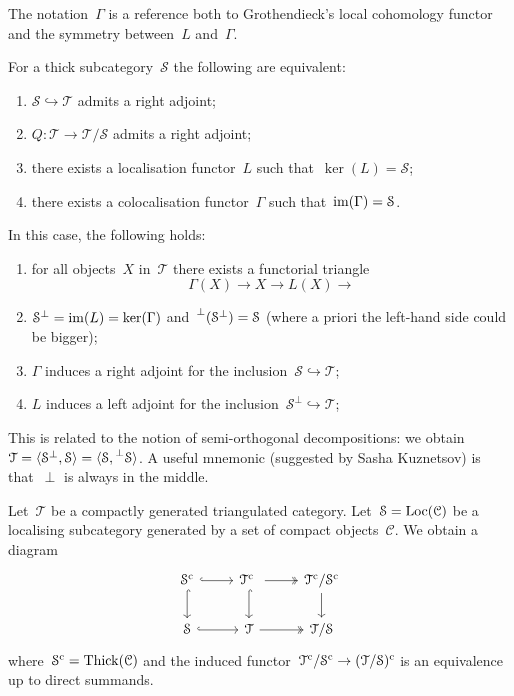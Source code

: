 \documentclass[10pt,a4paper]{article}
\begin{document}
\begin{remark}
  The notation~$\Gamma$ is a reference both to Grothendieck's local cohomology functor and the symmetry between~$L$ and~$\Gamma$.
\end{remark}
\begin{proposition}
  For a thick subcategory~$\mathcal{S}$ the following are equivalent:
  \begin{enumerate}
    \item $\mathcal{S}\hookrightarrow\mathcal{T}$ admits a right adjoint;
    \item $Q\colon\mathcal{T}\to\mathcal{T}/\mathcal{S}$ admits a right adjoint;
    \item there exists a localisation functor~$L$ such that~$\ker(L)=\mathcal{S}$;
    \item there exists a colocalisation functor~$\Gamma$ such that~$\operatorname{im}(\Gamma)=\mathcal{S}$.
  \end{enumerate}
\end{proposition}
In this case, the following holds:
\begin{enumerate}
  \item for all objects~$X$ in~$\mathcal{T}$ there exists a functorial triangle
    \begin{equation}
      \Gamma(X)\to X\to L(X)\to
    \end{equation}
  \item $\mathcal{S}^\perp=\operatorname{im}(L)=\ker(\Gamma)$ and~$\prescript{\perp}{}{(}\mathcal{S}^\perp)=\mathcal{S}$ (where a priori the left-hand side could be bigger);
  \item $\Gamma$ induces a right adjoint for the inclusion~$\mathcal{S}\hookrightarrow\mathcal{T}$;
  \item $L$ induces a left adjoint for the inclusion~$\mathcal{S}^\perp\hookrightarrow\mathcal{T}$;
\end{enumerate}
\begin{remark}
  This is related to the notion of semi-orthogonal decompositions: we obtain~$\mathcal{T}=\langle\mathcal{S}^\perp,\mathcal{S}\rangle=\langle\mathcal{S},\prescript{\perp}{}{\mathcal{S}}\rangle$. A useful mnemonic (suggested by Sasha Kuznetsov) is that~$\perp$ is always in the middle.
\end{remark}
\begin{example}
  Let~$\mathcal{T}$ be a compactly generated triangulated category. Let~$\mathcal{S}=\operatorname{Loc}(\mathcal{C})$ be a localising subcategory generated by a set of compact objects~$\mathcal{C}$. We obtain a diagram
  \begin{equation}
    \begin{tikzcd}
      \mathcal{S}^\cc \arrow[hook]{r} \arrow[hook]{d} & \mathcal{T}^\cc \arrow[two heads]{r} \arrow[hook]{d} & \mathcal{T}^\cc/\mathcal{S}^\cc \arrow{d} \\
      \mathcal{S} \arrow[hook]{r} & \mathcal{T} \arrow[two heads]{r} & \mathcal{T}/\mathcal{S}
    \end{tikzcd}
  \end{equation}
  where~$\mathcal{S}^{\mathrm{c}}=\operatorname{Thick}(\mathcal{C})$ and the induced functor~$\mathcal{T}^{\mathrm{c}}/\mathcal{S}^{\mathrm{c}}\to(\mathcal{T}/\mathcal{S})^{\mathrm{c}}$ is an equivalence up to direct summands.
\end{example}
\end{document}
